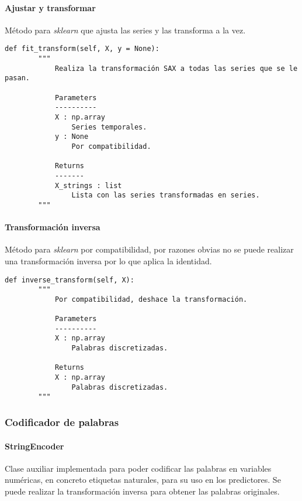 \paragraph{Ajustar y transformar}

Método para \emph{sklearn} que ajusta las series y las transforma a la vez.

\begin{lstlisting}
def fit_transform(self, X, y = None):
        """
            Realiza la transformación SAX a todas las series que se le pasan.

            Parameters
            ----------
            X : np.array
                Series temporales.
            y : None
                Por compatibilidad.

            Returns
            -------
            X_strings : list
                Lista con las series transformadas en series.
        """
\end{lstlisting}

\paragraph{Transformación inversa}

Método para \emph{sklearn} por compatibilidad, por razones obvias no se puede realizar una transformación inversa por lo que aplica la identidad.

\begin{lstlisting}
def inverse_transform(self, X):
        """
            Por compatibilidad, deshace la transformación.

            Parameters
            ----------
            X : np.array
                Palabras discretizadas.

            Returns
            X : np.array
                Palabras discretizadas.
        """
\end{lstlisting}

\subsubsection{Codificador de palabras}

\paragraph{StringEncoder}

Clase auxiliar implementada para poder codificar las palabras en variables numéricas, en concreto etiquetas naturales, para su uso en los predictores. Se puede realizar la transformación inversa para obtener las palabras originales.

